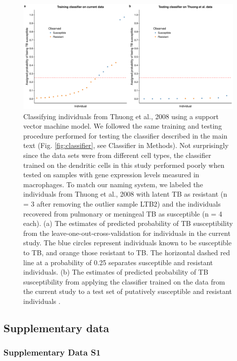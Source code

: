 \documentclass[fleqn,10pt]{wlscirep}
\begin{document}
\begin{figure}[ht]
\centering
\includegraphics[width=\linewidth]{../figure/classifier-svm-thuong.pdf}
\caption{
Classifying individuals from Thuong et al., 2008\cite{Thuong2008}
using a support vector machine model. We followed the same training
and testing procedure performed for testing the classifier described
in the main text (Fig. \ref{fig:classifier}, see Classifier in
Methods). Not surprisingly since the data sets were from different
cell types, the classifier trained on the dendritic cells in this
study performed poorly when tested on samples with gene expression
levels measured in macrophages. To match our naming system, we labeled
the individuals from Thuong et al., 2008\cite{Thuong2008} with latent
TB as resistant (n = 3 after removing the outlier sample LTB2) and the
individuals recovered from pulmonary or meningeal TB as susceptible (n
= 4 each). (a) The estimates of predicted probability of TB
susceptibility from the leave-one-out-cross-validation for individuals
in the current study. The blue circles represent individuals known to
be susceptible to TB, and orange those resistant to TB. The horizontal
dashed red line at a probability of 0.25 separates susceptible and
resistant individuals. (b) The estimates of predicted probability of
TB susceptibility from applying the classifier trained on the data
from the current study to a test set of putatively susceptible and
resistant individuals \cite{Thuong2008}.
}
\label{fig:class-svm-thuong}
\end{figure}
\clearpage\newpage
\subsection*{Supplementary data}

\subsubsection*{Supplementary Data S1}
\end{document}
